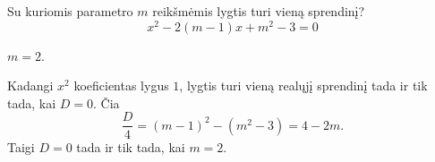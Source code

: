 \begin{salyga}
Su kuriomis parametro $m$ reikšmėmis lygtis turi vieną sprendinį?
    \[ x^2 - 2(m - 1)x + m^2 - 3 = 0 \]
\end{salyga}

\begin{atsakymas}
$m=2$.
\end{atsakymas}

\begin{sprendimas}
Kadangi $x^2$ koeficientas lygus $1$, lygtis turi vieną realųjį sprendinį tada ir tik tada, kai $D=0$. Čia
\[
\frac D4=(m-1)^2-(m^2-3)=4-2m.
\]
Taigi $D=0$ tada ir tik tada, kai $m=2$.
\end{sprendimas}
